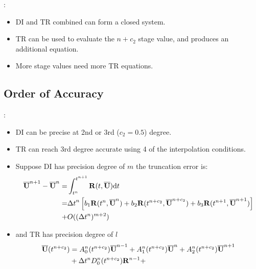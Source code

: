 \documentclass[aspectratio=169,serif]{beamer} %
\begin{document}
\begin{frame}[allowframebreaks]{\secname: \subsecname}
  \begin{itemize}
    \item DI  and TR  combined can form
          a closed system.
    \item TR can be used to evaluate the $n+c_2$
          stage value, and produces an additional equation.
    \item More stage values need more TR equations.
  \end{itemize}
\end{frame}

\subsection{Order of Accuracy}

\begin{frame}[allowframebreaks]{\secname: \subsecname}
  \begin{itemize}
    \item DI  can be precise at 2nd or 3rd ($c_2=0.5$) degree.
    \item TR can reach 3rd degree accurate using 4 of the interpolation conditions.
    \item Suppose DI has precision degree of $m$ the truncation error is:
          \begin{equation}
            \label{eq:Quad3Err}
            \begin{aligned}
              \overline{\mathbf{U}}^{n+1} - \overline{\mathbf{U}}^{n} = & \int_{t^n}^{t^{n+1}}{
              \mathbf{R}(t, \overline{\mathbf{U}})\dd t}                              \\  = &
              {{\Delta} t}^{n}
              \left[
                b_1\mathbf{R}(t^n, \overline{\mathbf{U}}^n)
                +
                b_2\mathbf{R}(t^{n+c_2}, \overline{\mathbf{U}}^{n+c_2})
                +
                b_3\mathbf{R}(t^{n+1}, \overline{\mathbf{U}}^{n+1})
                \right]
              \\ + &
              O(({\Delta} t^{n})^{m+2} )
            \end{aligned}
          \end{equation}
    \item and TR has precision degree of $l$
          \begin{equation}
            \begin{aligned}
              \label{eq:TRErr}
              \uu(t^{n+c_2}) & =
              A^n_0(t^{n+c_2})\uu^{n - 1} +
              A^n_1(t^{n+c_2})\uu^{n} +
              A^n_2(t^{n+c_2})\uu^{n + 1}
              \\ & +
              \inc t^n D^n_0(t^{n+c_2})\R^{n - 1} +

\end{aligned}
\end{equation}
\end{itemize}
\end{frame}
\end{document}
